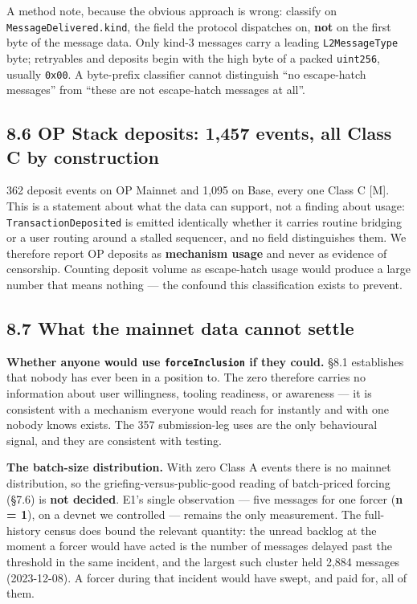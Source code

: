 \documentclass[conference]{IEEEtran}
\renewcommand{\_}{\textunderscore\allowbreak}
\begin{document}
A method note, because the obvious approach is wrong: classify on
\texttt{MessageDelivered.kind}, the field the protocol dispatches on,
\textbf{not} on the first byte of the message data. Only kind-3 messages
carry a leading \texttt{L2MessageType} byte; retryables and deposits
begin with the high byte of a packed \texttt{uint256}, usually
\texttt{0x00}. A byte-prefix classifier cannot distinguish ``no
escape-hatch messages'' from ``these are not escape-hatch messages at
all''.

\subsection{8.6 OP Stack deposits: 1,457 events, all Class C by
construction}\label{op-stack-deposits-1457-events-all-class-c-by-construction}

362 deposit events on OP Mainnet and 1,095 on Base, every one Class C
{[}M{]}. This is a statement about what the data can support, not a
finding about usage: \texttt{TransactionDeposited} is emitted
identically whether it carries routine bridging or a user routing around
a stalled sequencer, and no field distinguishes them. We therefore
report OP deposits as \textbf{mechanism usage} and never as evidence of
censorship. Counting deposit volume as escape-hatch usage would produce
a large number that means nothing --- the confound this classification
exists to prevent.

\subsection{8.7 What the mainnet data cannot
settle}\label{what-the-mainnet-data-cannot-settle}

\textbf{Whether anyone would use \texttt{forceInclusion} if they could.}
§8.1 establishes that nobody has ever been in a position to. The zero
therefore carries no information about user willingness, tooling
readiness, or awareness --- it is consistent with a mechanism everyone
would reach for instantly and with one nobody knows exists. The 357
submission-leg uses are the only behavioural signal, and they are
consistent with testing.

\textbf{The batch-size distribution.} With zero Class A events there is
no mainnet distribution, so the griefing-versus-public-good reading of
batch-priced forcing (§7.6) is \textbf{not decided}. E1's single
observation --- five messages for one forcer (\textbf{n = 1}), on a
devnet we controlled --- remains the only measurement. The full-history
census does bound the relevant quantity: the unread backlog at the
moment a forcer would have acted is the number of messages delayed past
the threshold in the same incident, and the largest such cluster held
2,884 messages (2023-12-08). A forcer during that incident would have
swept, and paid for, all of them.
\end{document}
